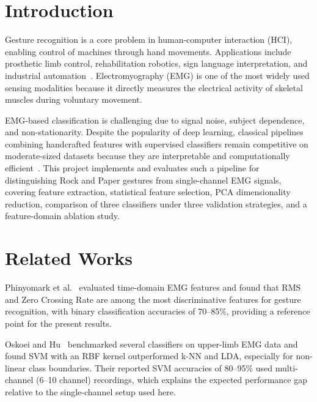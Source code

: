 \documentclass[11pt,a4paper]{article}
\begin{document}

\section{Introduction}

Gesture recognition is a core problem in human-computer interaction (HCI), enabling control of machines through hand movements. Applications include prosthetic limb control, rehabilitation robotics, sign language interpretation, and industrial automation~\cite{phinyomark2012feature}. Electromyography (EMG) is one of the most widely used sensing modalities because it directly measures the electrical activity of skeletal muscles during voluntary movement.

EMG-based classification is challenging due to signal noise, subject dependence, and non-stationarity. Despite the popularity of deep learning, classical pipelines combining handcrafted features with supervised classifiers remain competitive on moderate-sized datasets because they are interpretable and computationally efficient~\cite{atzori2016deep}. This project implements and evaluates such a pipeline for distinguishing Rock and Paper gestures from single-channel EMG signals, covering feature extraction, statistical feature selection, PCA dimensionality reduction, comparison of three classifiers under three validation strategies, and a feature-domain ablation study.

\section{Related Works}

Phinyomark et al.~\cite{phinyomark2012feature} evaluated time-domain EMG features and found that RMS and Zero Crossing Rate are among the most discriminative features for gesture recognition, with binary classification accuracies of 70--85\%, providing a reference point for the present results.

Oskoei and Hu~\cite{oskoei2007myoelectric} benchmarked several classifiers on upper-limb EMG data and found SVM with an RBF kernel outperformed k-NN and LDA, especially for non-linear class boundaries. Their reported SVM accuracies of 80--95\% used multi-channel (6--10 channel) recordings, which explains the expected performance gap relative to the single-channel setup used here.
\end{document}
